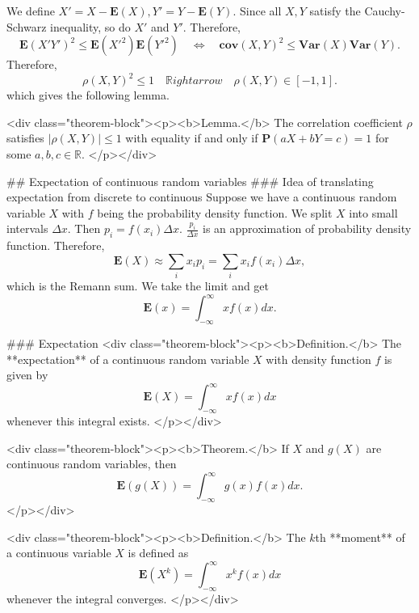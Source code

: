 We define $X' = X-\mathbf{E}(X), Y' = Y - \mathbf{E}(Y)$. Since all $X, Y$ satisfy the Cauchy-Schwarz inequality, so do $X'$ and $Y'$. Therefore, 
$$\begin{equation}
    \mathbf{E}(X'Y')^2 \leq \mathbf{E}(X'^2) \mathbf{E}(Y'^2) \quad \Leftrightarrow \quad \mathbf{cov}(X, Y)^2 \leq \mathbf{Var}(X)\mathbf{Var}(Y).
\end{equation}$$
Therefore, 
$$\begin{equation}
    \rho(X,Y)^2 \leq 1 \quad \mathbb{R}ightarrow \quad \rho(X,Y) \in [-1, 1].
\end{equation}$$
which gives the following lemma.

<div class="theorem-block"><p><b>Lemma.</b> 
The correlation coefficient $\rho$ satisfies $\left\vert \rho (X, Y)  \right\vert \leq 1$ with equality if and only if $\mathbf{P}(aX + bY = c) = 1$ for some $a, b, c \in \mathbb{R}$. 
</p></div>


## Expectation of continuous random variables
### Idea of translating expectation from discrete to continuous
Suppose we have a continuous random variable $X$ with $f$ being the probability density function. We split $X$ into small intervals $\Delta x$. Then $p_i = f(x_i)\Delta x$. $\frac{p_i}{\Delta x}$ is an approximation of probability density function. Therefore, 
$$\begin{equation}
    \mathbf{E}(X) \approx \sum_{i} x_i p_i = \sum_{i} x_i f(x_i) \Delta x,
\end{equation}$$
which is the Remann sum. We take the limit and get
$$\begin{equation}
    \mathbf{E}(x) = \int_{-\infty}^\infty x f(x)dx.
\end{equation}$$

### Expectation
<div class="theorem-block"><p><b>Definition.</b> 
The **expectation** of a continuous random variable $X$ with density function $f$ is given by 
$$\begin{equation}
    \mathbf{E}(X) = \int_{-\infty}^\infty xf(x) dx
\end{equation}$$
whenever this integral exists.
</p></div>

<div class="theorem-block"><p><b>Theorem.</b> 
If $X$ and $g(X)$ are continuous random variables, then $$\begin{equation}
    \mathbf{E}\left( g(X) \right) = \int_{-\infty}^\infty g(x)f(x) dx.
\end{equation}$$
</p></div>

<div class="theorem-block"><p><b>Definition.</b> 
The $k$th **moment** of a continuous variable $X$ is defined as
$$\begin{equation}
    \mathbf{E}(X^k) = \int_{-\infty}^\infty x^k f(x) dx
\end{equation}$$
whenever the integral converges.
</p></div>

